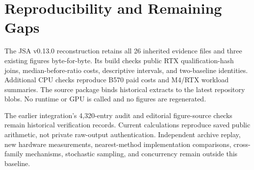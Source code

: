 \section{Reproducibility and Remaining Gaps}
The JSA v0.13.0 reconstruction retains all 26 inherited evidence files and three existing figures byte-for-byte. Its build checks public RTX qualification-hash joins, median-before-ratio costs, descriptive intervals, and two-baseline identities. Additional CPU checks reproduce B570 paid costs and M4/RTX workload summaries. The source package binds historical extracts to the latest repository blobs. No runtime or GPU is called and no figures are regenerated.

The earlier integration's 4,320-entry audit and editorial figure-source checks remain historical verification records. Current calculations reproduce saved public arithmetic, not private raw-output authentication. Independent archive replay, new hardware measurements, nearest-method implementation comparisons, cross-family mechanisms, stochastic sampling, and concurrency remain outside this baseline.
